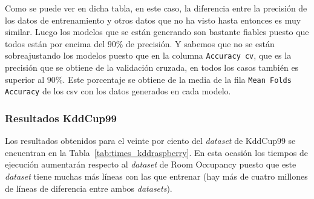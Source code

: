 \documentclass[a4paper, 12pt]{book}
\begin{document}
Como se puede ver en dicha tabla, en este caso, la diferencia entre la precisión de los datos de entrenamiento y otros datos que no ha visto hasta entonces es muy similar. Luego los modelos que se están generando son bastante fiables puesto que todos están por encima del $90\%$ de precisión. Y sabemos que no se están sobreajustando los modelos puesto que en la columna \texttt{Accuracy cv}, que es la precisión que se obtiene de la validación cruzada, en todos los casos también es superior al $90\%$. Este porcentaje se obtiene de la media de la fila \texttt{Mean Folds Accuracy} de los csv con los datos generados en cada modelo.

\subsubsection{Resultados KddCup99}
\label{subsubsec:kdd_raspberry}

Los resultados obtenidos para el veinte por ciento del \textit{dataset} de KddCup99 se encuentran en la Tabla~\ref{tab:times_kddraspberry}. En esta ocasión los tiempos de ejecución aumentarán respecto al \textit{dataset} de Room Occupancy puesto que este \textit{dataset} tiene muchas más líneas con las que entrenar (hay más de cuatro millones de líneas de diferencia entre ambos \textit{datasets}).
\end{document}
